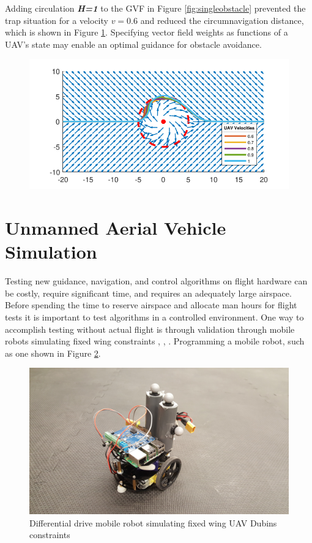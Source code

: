 \documentclass[numbered,pdftex]{ohio-etd}
\begin{document}
Adding circulation \textit{\textbf{H=1}} to the GVF in Figure \ref{fig:singleobstacle} prevented the trap situation for a velocity $v = 0.6$ and reduced the circumnavigation distance, which is shown in Figure \ref{fig:singleobstacleWithCirc}. Specifying vector field weights as functions of a UAV's state may enable an optimal guidance for obstacle avoidance. 

\begin{figure}[h]
	\centering
	\includegraphics[width=12cm]{PaperFigures/singleObstacleWithCirc}
	\caption{}
	\label{fig:singleobstacleWithCirc}
\end{figure}




\pagebreak
\section{Unmanned Aerial Vehicle Simulation}
Testing new guidance, navigation, and control algorithms on flight hardware can be costly, require significant time, and requires an adequately large airspace. Before spending the time to reserve airspace and allocate man hours for flight tests it is important to test algorithms in a controlled environment. One way to accomplish testing without actual flight is through validation through mobile robots simulating fixed wing constraints \cite{ren_experimental_2007}, \cite{louali_designing_2014}, \cite{louali_experimental_2016}. Programming a mobile robot, such as one shown in Figure \ref{fig:robot}.

\begin{figure}
	\centering
	\includegraphics[width=15cm]{PaperFigures/robot}
	\caption{Differential drive mobile robot simulating fixed wing UAV Dubins constraints}
	\label{fig:robot}
\end{figure}
\end{document}
